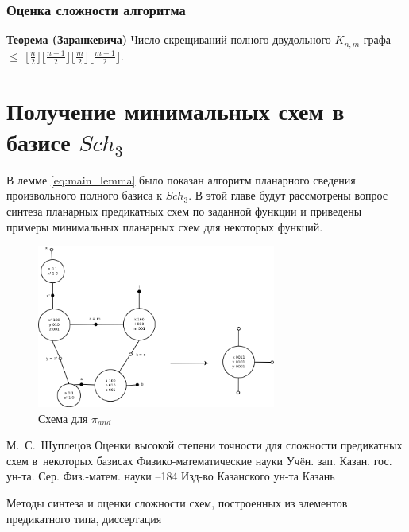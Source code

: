 \documentclass[12pt]{article}
\begin{document}
\subsubsection{Оценка сложности алгоритма}

\label{ZarankTheorem}
\textbf{Теорема (Заранкевича)} Число скрещиваний полного двудольного $K_{n,m}$ графа $\leq$
$\lfloor \frac{n}{2} \rfloor \lfloor \frac{n-1}{2} \rfloor \lfloor \frac{m}{2} \rfloor \lfloor \frac{m-1}{2} \rfloor$.
\cite{Zarank54}

\clearpage
\section{Получение минимальных схем в базисе $Sch_3$}
В лемме \ref{eq:main_lemma} было показан алгоритм планарного сведения произвольного полного базиса к $Sch_3$. 
В этой главе будут рассмотрены вопрос синтеза планарных предикатных схем по заданной функции и 
приведены примеры минимальных планарных схем для некоторых функций.


\begin{figure}[htb]
\centering
\includegraphics[width=0.7\textwidth]{min_and.png}
\caption{Схема для $\pi_{and}$}
\label{fig:and}
\end{figure}

\clearpage
{}
    \by М.~С.~Шуплецов
    \paper Оценки высокой степени точности для сложности предикатных схем в~некоторых базисах
    \inbook Физико-математические науки
    \serial Уч\"eн. зап. Казан. гос. ун-та. Сер. Физ.-матем. науки
    --184
    \publ Изд-во Казанского ун-та
    \publaddr Казань

Методы синтеза и оценки сложности схем, построенных из элементов предикатного типа, диссертация
\end{document}
